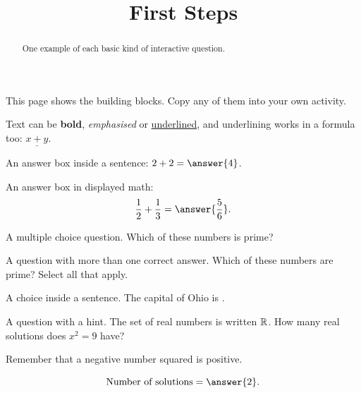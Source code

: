 \documentclass{ximera}
\title{First Steps}
\begin{document}
\begin{abstract}
One example of each basic kind of interactive question.
\end{abstract}
\maketitle

This page shows the building blocks. Copy any of them into your own activity.

Text can be \textbf{bold}, \emph{emphasised} or \underline{underlined}, and
underlining works in a formula too: $\underline{x+y}$.

\begin{problem}
An answer box inside a sentence: $2+2=\answer{4}$.
\end{problem}

\begin{problem}
An answer box in displayed math:
\[
\frac{1}{2}+\frac{1}{3}=\answer{\frac{5}{6}}.
\]
\end{problem}

\begin{problem}
A multiple choice question. Which of these numbers is prime?

\begin{multipleChoice}
\end{multipleChoice}
\end{problem}

\begin{problem}
A question with more than one correct answer. Which of these numbers are
prime? Select all that apply.

\begin{selectAll}
\end{selectAll}
\end{problem}

\begin{problem}
A choice inside a sentence. The capital of Ohio is
.
\end{problem}

\begin{problem}
A question with a hint. The set of real numbers is written $\mathbb{R}$. How many
real solutions does $x^2=9$ have?

\begin{hint}
Remember that a negative number squared is positive.
\end{hint}

\[
\text{Number of solutions}=\answer{2}.
\]
\end{problem}
\end{document}
